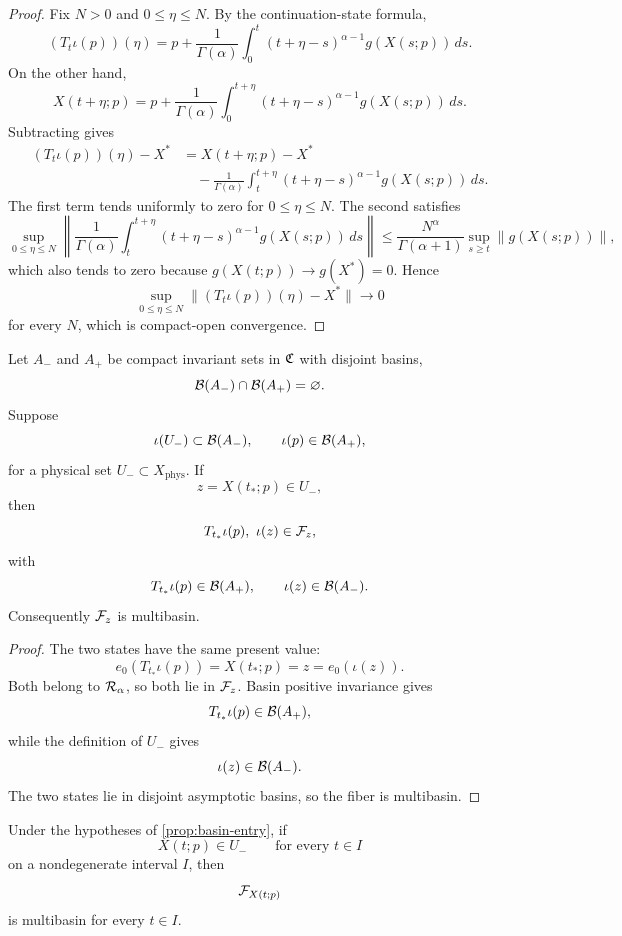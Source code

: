 \begin{proof}
Fix \(N>0\) and \(0\le\eta\le N\). By the continuation-state formula,
\[
  (T_t\iota(p))(\eta)
  =
  p+
  \frac{1}{\Gamma(\alpha)}
  \int_0^t
  (t+\eta-s)^{\alpha-1}g(X(s;p))\,ds.
\]
On the other hand,
\[
  X(t+\eta;p)
  =
  p+
  \frac{1}{\Gamma(\alpha)}
  \int_0^{t+\eta}
  (t+\eta-s)^{\alpha-1}g(X(s;p))\,ds.
\]
Subtracting gives
\begin{align*}
  (T_t\iota(p))(\eta)-X^*
  &=
  X(t+\eta;p)-X^* \\
  &\quad-
  \frac{1}{\Gamma(\alpha)}
  \int_t^{t+\eta}
  (t+\eta-s)^{\alpha-1}g(X(s;p))\,ds.
\end{align*}
The first term tends uniformly to zero for \(0\le\eta\le N\). The second satisfies
\[
  \sup_{0\le\eta\le N}
  \left\|
  \frac{1}{\Gamma(\alpha)}
  \int_t^{t+\eta}
  (t+\eta-s)^{\alpha-1}g(X(s;p))\,ds
  \right\|
  \le
  \frac{N^\alpha}{\Gamma(\alpha+1)}
  \sup_{s\ge t}\|g(X(s;p))\|,
\]
which also tends to zero because \(g(X(t;p))\to g(X^*)=0\). Hence
\[
  \sup_{0\le\eta\le N}
  \|(T_t\iota(p))(\eta)-X^*\|\to0
\]
for every \(N\), which is compact-open convergence.
\end{proof}

\begin{proposition}
\label{prop:basin-entry}
Let \(A_-\) and \(A_+\) be compact invariant sets in \(\mathfrak{C}\) with disjoint basins,
\[
  \mathcal{B}(A_-)\cap\mathcal{B}(A_+)=\varnothing.
\]
Suppose
\[
  \iota(U_-)\subset\mathcal{B}(A_-),
  \qquad
  \iota(p)\in\mathcal{B}(A_+),
\]
for a physical set \(U_-\subset X_{\mathrm{phys}}\). If
\[
  z=X(t_*;p)\in U_-,
\]
then
\[
  T_{t_*}\iota(p),\ \iota(z)\in\Fiber{z},
\]
with
\[
  T_{t_*}\iota(p)\in\mathcal{B}(A_+),
  \qquad
  \iota(z)\in\mathcal{B}(A_-).
\]
Consequently \(\mathcal{F}_{z}\) is multibasin.
\end{proposition}

\begin{proof}
The two states have the same present value:
\[
  e_0(T_{t_*}\iota(p))
  =
  X(t_*;p)
  =
  z
  =
  e_0(\iota(z)).
\]
Both belong to \(\mathcal{R}_{\alpha}\), so both lie in \(\mathcal{F}_{z}\). Basin positive invariance gives
\[
  T_{t_*}\iota(p)\in\mathcal{B}(A_+),
\]
while the definition of \(U_-\) gives
\[
  \iota(z)\in\mathcal{B}(A_-).
\]
The two states lie in disjoint asymptotic basins, so the fiber is multibasin.
\end{proof}

\begin{corollary}
\label{cor:time-interval}
Under the hypotheses of \cref{prop:basin-entry}, if
\[
  X(t;p)\in U_-
  \qquad
  \text{for every }t\in I
\]
on a nondegenerate interval \(I\), then
\[
  \mathcal{F}_{X(t;p)}
\]
is multibasin for every \(t\in I\).
\end{corollary}

